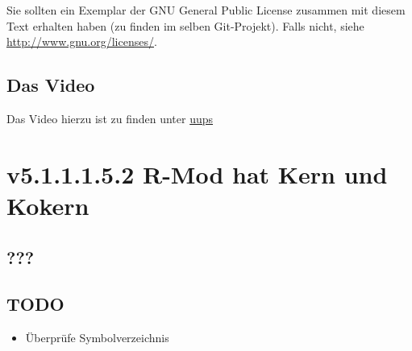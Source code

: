 \documentclass[a4paper]{amsart}
\theoremstyle{definition}
\begin{document}
Sie sollten ein Exemplar der GNU General Public License zusammen mit diesem Text erhalten haben
(zu finden im selben Git-Projekt).
Falls nicht, siehe \url{http://www.gnu.org/licenses/}.

\subsection*{Das Video}
Das Video hierzu ist zu finden unter
{\tiny
   \url{uups}
}

\section{v5.1.1.1.5.2 R-Mod hat Kern und Kokern}

\subsection{???}


\begin{backup}
\section{TODO}
\begin{itemize}
     \item Überprüfe Symbolverzeichnis
\end{itemize}


\end{backup}
\end{document}
